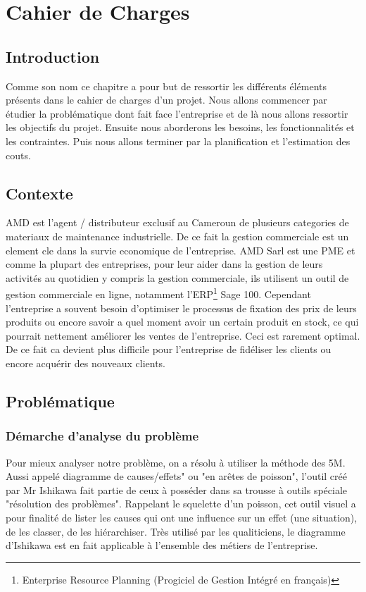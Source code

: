 \chapter{Cahier de Charges}

\section*{Introduction}%
%
Comme son nom ce chapitre a pour but de ressortir les différents éléments présents dans le cahier de charges d’un projet. Nous allons commencer par étudier la problématique dont fait face l’entreprise et de là nous allons ressortir les objectifs du projet. Ensuite nous aborderons les besoins, les fonctionnalités et les contraintes. Puis nous allons terminer par la planification et l'estimation des couts.

\section{Contexte}
AMD est l'agent / distributeur exclusif au Cameroun de plusieurs categories de materiaux de maintenance industrielle. De ce fait la gestion commerciale est un element cle dans la survie economique de l'entreprise. AMD Sarl est une PME et comme la plupart des entreprises, pour leur aider dans la gestion de leurs activités au quotidien y compris la gestion commerciale, ils utilisent un outil de gestion commerciale en ligne, notamment l’ERP\footnote{Enterprise Resource Planning (Progiciel de Gestion Intégré en français)} Sage 100.
Cependant l'entreprise a souvent besoin d'optimiser le processus de fixation des prix de leurs produits ou encore savoir a quel moment avoir un certain produit en stock, ce qui pourrait nettement améliorer les ventes de l'entreprise. Ceci est rarement optimal. De ce fait ca devient plus difficile pour l'entreprise de fidéliser les clients ou encore acquérir des nouveaux clients. 

\section{Problématique}
\subsection{Démarche d’analyse du problème}
Pour mieux analyser notre problème, on a résolu à utiliser la méthode des 5M. Aussi appelé diagramme de causes/effets" ou "en arêtes de poisson", l'outil créé par Mr Ishikawa fait partie de ceux à posséder dans sa trousse à outils spéciale "résolution des problèmes". Rappelant le squelette d'un poisson, cet outil visuel a pour finalité de lister les causes qui ont une influence sur un effet (une situation), de les classer, de les hiérarchiser. Très utilisé par les qualiticiens, le diagramme d'Ishikawa est en fait applicable à l'ensemble des métiers de l'entreprise.
